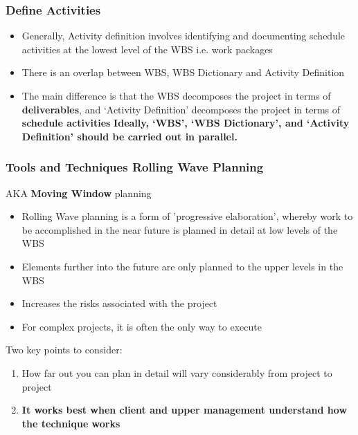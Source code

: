 \begin{frame}
\frametitle{Define Activities}
\begin{itemize}
	\item Generally, Activity definition involves identifying and documenting schedule activities at the lowest level of the WBS  i.e. work packages
	\item There is an overlap between WBS, WBS Dictionary and Activity Definition
	\item The main difference is that the WBS decomposes the project in terms of \textbf{deliverables}, and `Activity Definition' decomposes the project in terms of \textbf{schedule activities}
\textbf{Ideally, `WBS', `WBS Dictionary', and `Activity Definition' should be carried out in parallel.}
\end{itemize}
\end{frame}




\begin{frame}
\frametitle{Tools and Techniques \hfill Rolling Wave Planning}
AKA \textbf{Moving Window} planning
\begin{itemize}
	\item Rolling Wave planning is a form of 'progressive elaboration', whereby work to be accomplished in the near future is planned in detail at low levels of the WBS
	\item Elements further into the future are only planned to the upper levels in the WBS 
	\item Increases the risks associated with the project
	\item For complex projects, it is often the only way to execute
\end{itemize}

Two key points to consider:
\begin{enumerate}
	\item How far out you can plan in detail will vary considerably from project to project
	\item \textbf{It works best when client and upper management understand how the technique works} 
\end{enumerate}
\end{frame}




